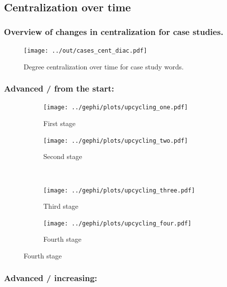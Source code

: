 \documentclass[a4paper]{scrartcl}
\begin{document}
  \subsection{Centralization over time}

    \subsubsection{Overview of changes in centralization for case studies.}

      \begin{figure}[H]
        \caption{Degree centralization over time for case study words.}
        \centering
        \texttt{[image: ../out/cases\_cent\_diac.pdf]}
      \end{figure}

    \subsubsection{Advanced / from the start: }

      \begin{figure}[H]
        \caption{Social network of diffusion for  over time.}
        \centering
        \begin{subfigure}{.45\linewidth}
          \caption{First stage}
          \centering
          \texttt{[image: ../gephi/plots/upcycling\_one.pdf]}
        \end{subfigure}
        \begin{subfigure}{.45\linewidth}
          \caption{Second stage}
          \centering
          \texttt{[image: ../gephi/plots/upcycling\_two.pdf]}
        \end{subfigure}\\
        \begin{subfigure}{.45\linewidth}
          \caption{Third stage}
          \centering
          \texttt{[image: ../gephi/plots/upcycling\_three.pdf]}
        \end{subfigure}
        \begin{subfigure}{.45\linewidth}
          \caption{Fourth stage}
          \centering
          \texttt{[image: ../gephi/plots/upcycling\_four.pdf]}
        \end{subfigure}
      \end{figure}

    \subsubsection{Advanced / increasing: }
\end{document}
